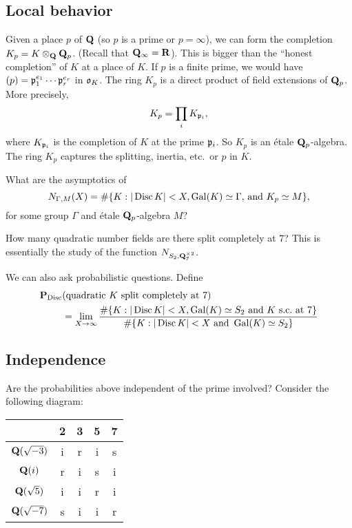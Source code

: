 \subsection{Local behavior}

Given a place $p$ of $\mathbf{Q}$ (so $p$ is a prime or $p=\infty$), we can form the 
completion $K_p = K\otimes_{\mathbf{Q}} \mathbf{Q}_p$. (Recall that $\mathbf{Q}_\infty=\mathbf{R}$). This is 
bigger than the ``honest completion'' of $K$ at a place of $K$. If $p$ is a 
finite prime, we would have $(p)=\mathfrak{p}_1^{e_1}\cdots \mathfrak{p}_r^{e_r}$ in $\mathfrak{o}_K$. The 
ring $K_p$ is a direct product of field extensions of $\mathbf{Q}_p$. More precisely, 
\[
  K_p = \prod_i K_{\mathfrak{p}_i} ,
\]
where $K_{\mathfrak{p}_i}$ is the completion of $K$ at the prime $\mathfrak{p}_i$. So $K_p$ is an 
\'etale $\mathbf{Q}_p$-algebra. The ring $K_p$ captures the splitting, inertia, etc.\ 
or $p$ in $K$. 

\begin{question}
What are the asymptotics of 
\[
  N_{\Gamma,M}(X) = \#\{K:|\operatorname{Disc} K|<X,\operatorname{Gal}(K)\simeq \Gamma\text{, and }K_p\simeq M\} ,
\]
for some group $\Gamma$ and \'etale $\mathbf{Q}_p$-algebra $M$?
\end{question}

\begin{example}
How many quadratic number fields are there split completely at $7$? This is 
essentially the study of the function $N_{S_2, \mathbf{Q}_7^{\times 2}}$. 
\end{example}

We can also ask probabilistic questions. Define 
\begin{align*}
  \mathbf{P}_{\operatorname{Disc}} &(\text{quadratic $K$ split completely at $7$}) \\
    &= \lim_{X\to \infty} \frac{\#\{K:|\operatorname{Disc} K|<X, \operatorname{Gal}(K)\simeq S_2\text{ and }K\text{ s.c.\ at $7$}\}}{\#\{K:|\operatorname{Disc} K|<X\text{ and }\operatorname{Gal}(K)\simeq S_2\}}
\end{align*}




\subsection{Independence}

Are the probabilities above independent of the prime involved? Consider the 
following diagram:
\begin{center}
\begin{tabular}{c|cccc}
  & 2 & 3 & 5 & 7  \\ \hline 
  $\mathbf{Q}(\sqrt{-3})$ & i & r & i & s \\
  $\mathbf{Q}(i)$ & r & i & s & i \\
  $\mathbf{Q}(\sqrt 5)$ & i & i & r & i \\
  $\mathbf{Q}(\sqrt{-7})$ & s & i & i & r
\end{tabular}
\end{center}

